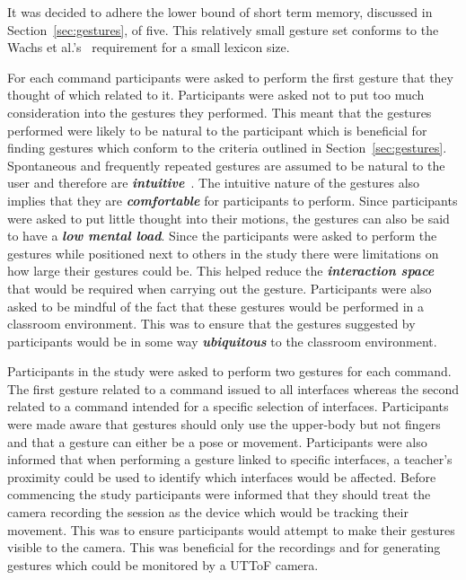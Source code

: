 \documentclass[manuscript, review, screen]{acmart}
\begin{document}
It was decided to adhere the lower bound of short term memory, discussed in Section~\ref{sec:gestures}, of five.
This relatively small gesture set conforms to the Wachs et al.'s~\citeyearpar{Wachs2011} requirement for a small lexicon size.

For each command participants were asked to perform the first gesture that they thought of which related to it.
Participants were asked not to put too much consideration into the gestures they performed.
This meant that the gestures performed were likely to be natural to the participant which is beneficial for finding gestures which conform to the criteria outlined in Section~\ref{sec:gestures}.
Spontaneous and frequently repeated gestures are assumed to be natural to the user and therefore are \textit{\textbf{intuitive}}~\citep{Grandhi2011}.
The intuitive nature of the gestures also implies that they are \textit{\textbf{comfortable}} for participants to perform.
Since participants were asked to put little thought into their motions, the gestures can also be said to have a \textit{\textbf{low mental load}}.
Since the participants were asked to perform the gestures while positioned next to others in the study there were limitations on how large their gestures could be.
This helped reduce the \textit{\textbf{interaction space}} that would be required when carrying out the gesture.
Participants were also asked to be mindful of the fact that these gestures would be performed in a classroom environment.
This was to ensure that the gestures suggested by participants would be in some way \textit{\textbf{ubiquitous}} to the classroom environment.

Participants in the study were asked to perform two gestures for each command.
The first gesture related to a command issued to all interfaces whereas the second related to a command intended for a specific selection of interfaces.
Participants were made aware that gestures should only use the upper-body but not fingers and that a gesture can either be a pose or movement.
Participants were also informed that when performing a gesture linked to specific interfaces, a teacher's proximity could be used to identify which interfaces would be affected.
Before commencing the study participants were informed that they should treat the camera recording the session as the device which would be tracking their movement.
This was to ensure participants would attempt to make their gestures visible to the camera.
This was beneficial for the recordings and for generating gestures which could be monitored by a \ac{UTToF} camera.
\end{document}
